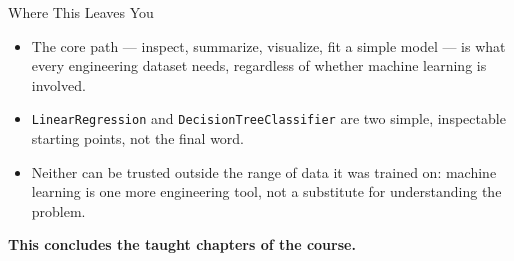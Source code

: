 \documentclass[9pt,aspectratio=169,xcolor=table]{beamer}
\begin{document}
\begin{frame}{Where This Leaves You}
    \leavevmode
    \small
    \begin{itemize}
        \item The \alert{core path} --- inspect, summarize, visualize,
              fit a simple model --- is what every engineering dataset
              needs, regardless of whether machine learning is involved.
        \item \texttt{LinearRegression} and
              \texttt{DecisionTreeClassifier} are two simple, inspectable
              starting points, not the final word.
        \item Neither can be trusted outside the range of data it was
              trained on: machine learning is \alert{one more
              engineering tool}, not a substitute for understanding the
              problem.
    \end{itemize}

    \vspace{4mm}
    \begin{center}
        \large\color{primary}\textbf{This concludes the taught chapters
        of the course.}
    \end{center}
\end{frame}
\end{document}
